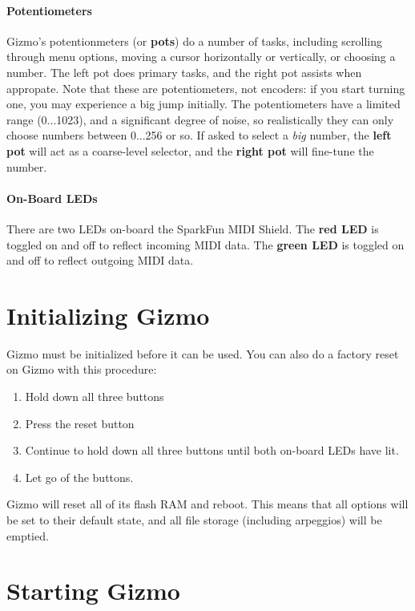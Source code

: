\documentclass{article}
\begin{document}
\paragraph{Potentiometers}

Gizmo's potentionmeters  (or {\bf pots}) do a number of tasks, including scrolling through menu options, moving a cursor horizontally or vertically, or choosing a number.  The left pot does primary tasks, and the right pot assists when appropate.  Note that these are potentiometers, not encoders: if you start turning one, you may experience a big jump initially.  The potentiometers have a limited range (0...1023), and a significant degree of noise, so realistically they can only choose numbers between 0...256 or so.  If asked to select a {\it big} number, the {\bf left pot} will act as a coarse-level selector, and the {\bf right pot} will fine-tune the number.


\paragraph{On-Board LEDs}

There are two LEDs on-board the SparkFun MIDI Shield.  The {\bf red LED} is toggled on and off to reflect incoming MIDI data.  The {\bf green LED} is toggled on and off to reflect outgoing MIDI data.  

\section{Initializing Gizmo}

Gizmo must be initialized before it can be used.  You can also do a factory reset on Gizmo with this procedure:

\begin{enumerate}
\item Hold down all three buttons
\item Press the reset button
\item Continue to hold down all three buttons until both on-board LEDs have lit.
\item Let go of the buttons.
\end{enumerate}

Gizmo will reset all of its flash RAM and reboot.  This means that all options will be set to their default state, and all file storage (including arpeggios) will be emptied.

\clearpage
\section{Starting Gizmo}
\end{document}
